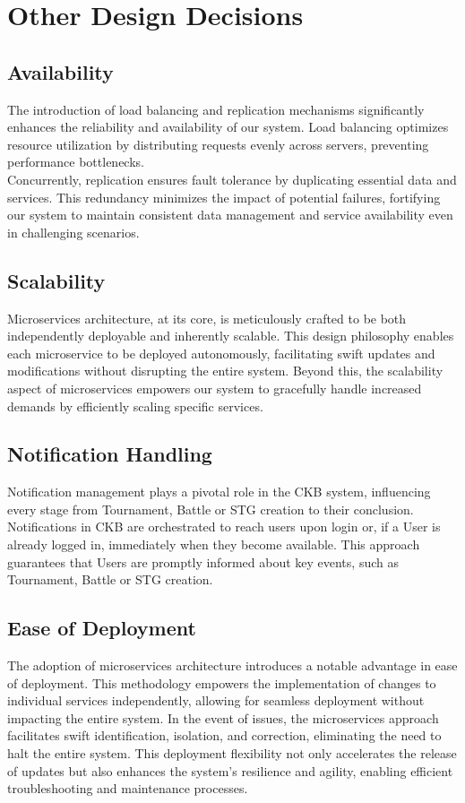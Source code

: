 \section{Other Design Decisions}
\label{sec:other_design_decisions}%

\subsection{Availability}
The introduction of load balancing and replication mechanisms significantly enhances the reliability and availability of our system. Load balancing optimizes resource utilization by distributing requests evenly across servers, preventing performance bottlenecks.\\ Concurrently, replication ensures fault tolerance by duplicating essential data and services. This redundancy minimizes the impact of potential failures, fortifying our system to maintain consistent data management and service availability even in challenging scenarios.

\subsection{Scalability}
Microservices architecture, at its core, is meticulously crafted to be both independently deployable and inherently scalable. This design philosophy enables each microservice to be deployed autonomously, facilitating swift updates and modifications without disrupting the entire system. Beyond this, the scalability aspect of microservices empowers our system to gracefully handle increased demands by efficiently scaling specific services.


\subsection{Notification Handling}
Notification management plays a pivotal role in the CKB system, influencing every stage from Tournament, Battle or STG creation to their conclusion. Notifications in CKB are orchestrated to reach users upon login or, if a User is already logged in, immediately when they become available. This approach guarantees that Users are promptly informed about key events, such as Tournament, Battle or STG creation. 

\subsection{Ease of Deployment} 
The adoption of microservices architecture introduces a notable advantage in ease of deployment. This methodology empowers the implementation of changes to individual services independently, allowing for seamless deployment without impacting the entire system. In the event of issues, the microservices approach facilitates swift identification, isolation, and correction, eliminating the need to halt the entire system. This deployment flexibility not only accelerates the release of updates but also enhances the system's resilience and agility, enabling efficient troubleshooting and maintenance processes.

